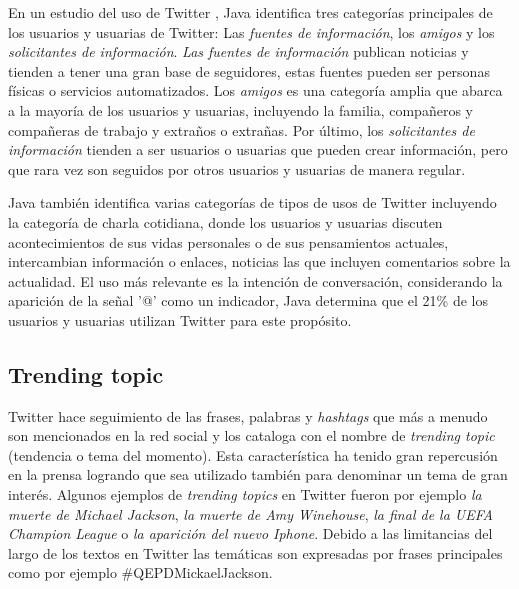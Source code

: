En un estudio del uso de Twitter \cite{JavaEtAl:07}, Java  identifica tres categorías principales de los usuarios y usuarias de Twitter: Las \emph{fuentes de información}, los \emph{amigos} y los \emph{solicitantes de información}.
\emph{Las fuentes de información} publican noticias y tienden a tener una gran base de seguidores, estas fuentes pueden ser personas físicas o servicios automatizados. Los \emph{amigos} es una categoría amplia que abarca a la mayoría de los usuarios y usuarias, incluyendo la familia, compañeros y compañeras de trabajo y extraños o extrañas. Por último, los \emph{solicitantes de información} tienden a ser usuarios o usuarias que pueden crear información, pero que rara vez son seguidos por otros usuarios y usuarias de manera regular.

Java \cite{JavaEtAl:07} también identifica varias categorías de tipos de usos de Twitter incluyendo la categoría de charla cotidiana, donde los usuarios y usuarias discuten acontecimientos de sus vidas personales o de sus pensamientos actuales, intercambian información o enlaces, noticias las que incluyen comentarios sobre la actualidad. El uso más relevante es la intención de conversación, considerando la aparición de la señal '@' como un indicador, Java determina que el 21\% de los usuarios y usuarias utilizan Twitter para este propósito.

\subsection{Trending topic}

Twitter hace seguimiento de	 las frases, palabras y \emph{hashtags} que más a menudo son mencionados en la red social y los cataloga con el nombre de \emph{trending topic} (tendencia o tema del momento). Esta característica ha tenido gran repercusión en la prensa logrando que sea utilizado también para denominar un tema de gran interés. Algunos ejemplos de \emph{trending topics} en Twitter fueron por ejemplo \emph{la muerte de Michael Jackson}, \emph{la muerte de Amy Winehouse}, \emph{la final de la UEFA Champion League} o \emph{la aparición del nuevo Iphone}. Debido a las limitancias del largo de los textos en Twitter las temáticas son expresadas por frases principales como por ejemplo \#QEPDMickaelJackson.
 

